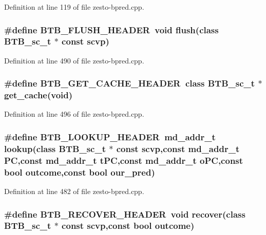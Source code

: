 Definition at line 119 of file zesto-bpred.cpp.
\subsubsection[{BTB\_\-FLUSH\_\-HEADER}]{\setlength{\rightskip}{0pt plus 5cm}\#define BTB\_\-FLUSH\_\-HEADER~void flush(class {\bf BTB\_\-sc\_\-t} $\ast$ const scvp)}\label{zesto-bpred_8cpp_886255b40042691b1f78d646bf5fb990}




Definition at line 490 of file zesto-bpred.cpp.
\subsubsection[{BTB\_\-GET\_\-CACHE\_\-HEADER}]{\setlength{\rightskip}{0pt plus 5cm}\#define BTB\_\-GET\_\-CACHE\_\-HEADER~class {\bf BTB\_\-sc\_\-t} $\ast$ get\_\-cache(void)}\label{zesto-bpred_8cpp_7f5fd9424a9e96d9faa0036d6e162108}




Definition at line 496 of file zesto-bpred.cpp.
\subsubsection[{BTB\_\-LOOKUP\_\-HEADER}]{\setlength{\rightskip}{0pt plus 5cm}\#define BTB\_\-LOOKUP\_\-HEADER~{\bf md\_\-addr\_\-t} lookup(class {\bf BTB\_\-sc\_\-t} $\ast$ const scvp,const {\bf md\_\-addr\_\-t} PC,const {\bf md\_\-addr\_\-t} tPC,const {\bf md\_\-addr\_\-t} oPC,const bool outcome,const bool our\_\-pred)}\label{zesto-bpred_8cpp_4568f772b49905e07f3b2aaa75acff0c}




Definition at line 482 of file zesto-bpred.cpp.
\subsubsection[{BTB\_\-RECOVER\_\-HEADER}]{\setlength{\rightskip}{0pt plus 5cm}\#define BTB\_\-RECOVER\_\-HEADER~void recover(class {\bf BTB\_\-sc\_\-t} $\ast$ const scvp,const bool outcome)}\label{zesto-bpred_8cpp_9f53ea12d9f534bf02bba2f6d89d504c}




